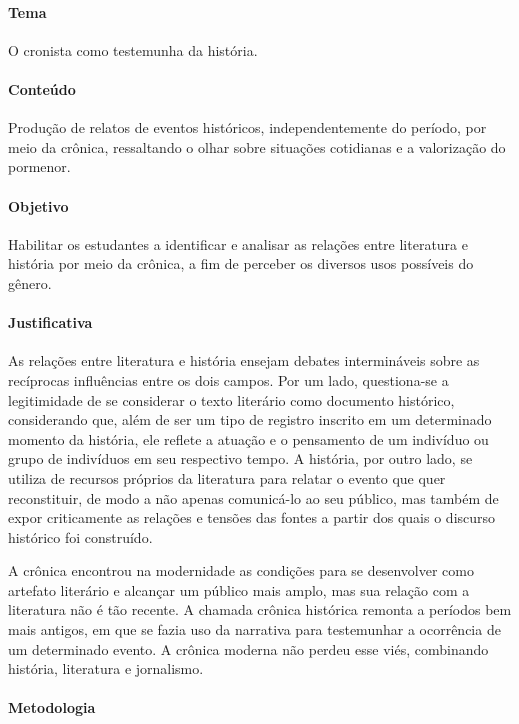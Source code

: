 \documentclass[12pt]{extarticle}
\begin{document}

\paragraph{Tema} O cronista como testemunha da história.

\paragraph{Conteúdo} Produção de relatos de eventos históricos,
independentemente do período, por meio da crônica, ressaltando o olhar
sobre situações cotidianas e a valorização do pormenor.

\paragraph{Objetivo} Habilitar os estudantes a identificar e analisar as
relações entre literatura e história por meio da crônica, a fim de
perceber os diversos usos possíveis do gênero.

\paragraph{Justificativa} As relações entre literatura e história ensejam
debates intermináveis sobre as recíprocas influências entre os dois
campos. Por um lado, questiona-se a legitimidade de se considerar o
texto literário como documento histórico, considerando que, além de ser
um tipo de registro inscrito em um determinado momento da história, ele
reflete a atuação e o pensamento de um indivíduo ou grupo de indivíduos
em seu respectivo tempo. A história, por outro lado, se utiliza de
recursos próprios da literatura para relatar o evento que quer
reconstituir, de modo a não apenas comunicá-lo ao seu público, mas
também de expor criticamente as relações e tensões das fontes a partir
dos quais o discurso histórico foi construído.

A crônica encontrou na modernidade as condições para se desenvolver como
artefato literário e alcançar um público mais amplo, mas sua relação com
a literatura não é tão recente. A chamada crônica histórica remonta a
períodos bem mais antigos, em que se fazia uso da narrativa para
testemunhar a ocorrência de um determinado evento. A crônica moderna não
perdeu esse viés, combinando história, literatura e jornalismo.

\paragraph{Metodologia} 
\end{document}
